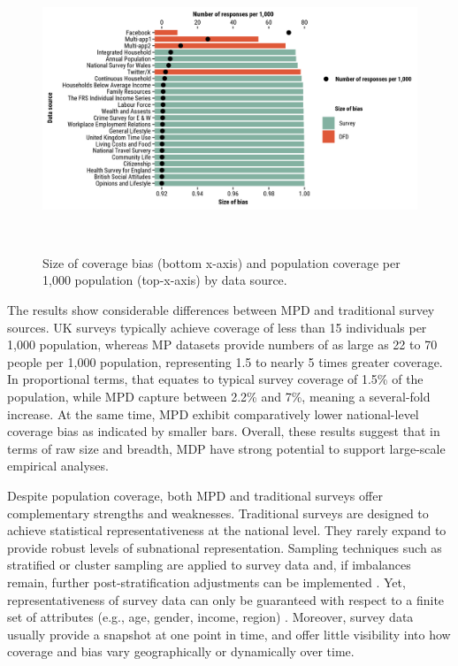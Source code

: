 \documentclass[]{rsos}%
\begin{document}
\begin{figure}
\centering
\includegraphics[width=14cm,height=8.5cm]{figures/compare-surveys-two-axis.png}
\caption{Size of coverage bias (bottom x-axis) and population coverage per
1,000 population (top-x-axis) by data
source.}\label{fig:survey}
\end{figure}

The results show considerable differences between MPD and
traditional survey sources. UK surveys typically achieve coverage of
less than 15 individuals per 1,000 population, whereas MP datasets provide numbers of as large as 22 to 70 people per 1,000 population, representing 1.5 to nearly 5 times greater coverage. In proportional terms, that equates to typical survey coverage of 1.5\% of the population, while MPD capture between 2.2\% and 7\%, meaning a several-fold increase. At the same time, MPD exhibit comparatively lower national-level coverage bias as indicated by smaller bars. Overall, these results suggest that in
terms of raw size and breadth, MDP have strong potential
to support large-scale empirical analyses.

Despite population coverage, both MPD and
traditional surveys offer complementary strengths and weaknesses.
Traditional surveys are designed to achieve statistical
representativeness at the national level. They rarely expand to provide robust levels of subnational representation. Sampling techniques
such as stratified or cluster sampling are applied to survey data and, if imbalances
remain, further post-stratification adjustments can be implemented
\citep{lohr2021}. Yet, representativeness of survey data can only be guaranteed with
respect to a finite set of attributes (e.g., age, gender, income,
region) \citep{cochran1977sampling}. Moreover, survey data usually provide a
snapshot at one point in time, and offer little visibility into how
coverage and bias vary geographically or dynamically over time.
\end{document}

